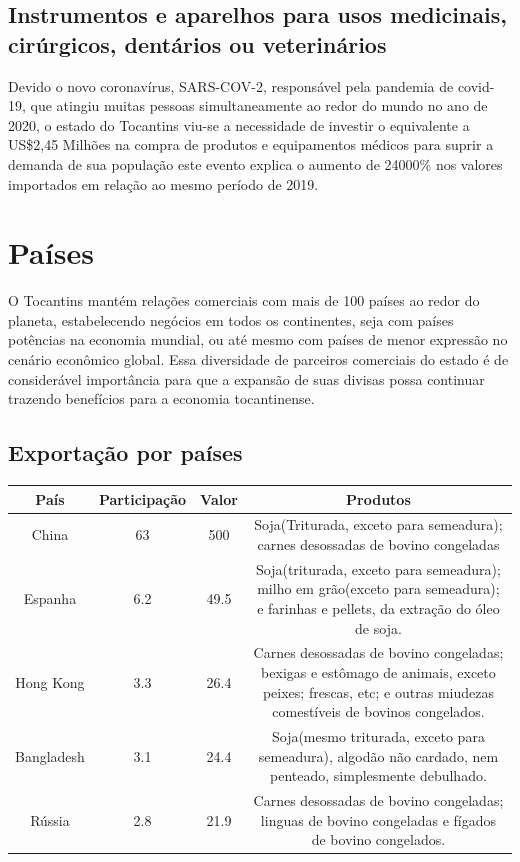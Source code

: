 \subsection{Instrumentos e aparelhos para usos medicinais, cirúrgicos, dentários ou veterinários}
\par Devido o novo coronavírus, SARS-COV-2, responsável pela pandemia de covid-19, que atingiu muitas pessoas simultaneamente ao redor do mundo no ano de 2020, o estado do Tocantins viu-se a necessidade de investir o equivalente a US\$2,45 Milhões na compra de produtos e equipamentos médicos para suprir a demanda de sua população este evento explica o aumento de 24000\% nos valores importados em relação ao mesmo período de 2019.

\section{Países}
\par O Tocantins mantém relações comerciais com mais de 100 países ao redor do planeta, estabelecendo negócios em todos os continentes, seja com países potências na economia mundial, ou até mesmo com países de menor expressão no cenário econômico global. Essa diversidade de parceiros comerciais do estado é de considerável importância para que a expansão de suas divisas possa continuar trazendo benefícios para a economia tocantinense.

\subsection{Exportação por países}
\begin{tabular}{|c|c|c|c|}
	\hline
	País & Participação & Valor & Produtos \\
	\hline
	China & 63 & 500 & Soja(Triturada, exceto para semeadura); carnes desossadas de bovino congeladas\\
	\hline
	Espanha & 6.2 & 49.5 & Soja(triturada, exceto para semeadura); milho em grão(exceto para semeadura); e farinhas e pellets, da extração do óleo de soja. \\
	\hline
	Hong Kong & 3.3 & 26.4 & 
	Carnes desossadas de bovino congeladas; bexigas e estômago de animais, exceto peixes; frescas, etc; e outras miudezas comestíveis de bovinos congelados. \\
	\hline 
	Bangladesh & 3.1 & 24.4 & Soja(mesmo triturada, exceto para semeadura), algodão não cardado, nem penteado, simplesmente debulhado. \\
	\hline
	Rússia & 2.8 & 21.9 & Carnes desossadas de bovino congeladas; linguas de bovino congeladas e fígados de bovino congelados. \\
	\hline
\end{tabular}
 

